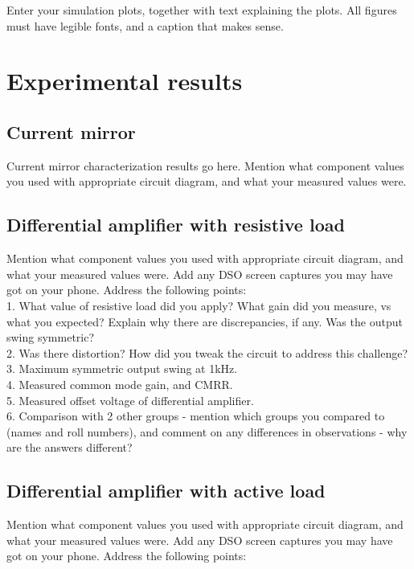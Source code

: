 \documentclass[12pt]{article}
\begin{document}
Enter your simulation plots, together with text explaining the plots. All figures must have legible fonts, and a caption that makes sense.

\section{Experimental results}

\subsection{Current mirror}

Current mirror characterization results go here. Mention what component values you used with appropriate circuit diagram, and what your measured values were.

\subsection{Differential amplifier with resistive load}

Mention what component values you used with appropriate circuit diagram, and what your measured values were. Add any DSO screen captures you may have got on your phone. Address the following points:\\

1. What value of resistive load did you apply? What gain did you measure, vs what you expected? Explain why there are discrepancies, if any. Was the output swing symmetric?\\
2. Was there distortion? How did you tweak the circuit to address this challenge?\\
3. Maximum symmetric output swing at 1kHz.\\
4. Measured common mode gain, and CMRR.\\
5. Measured offset voltage of differential amplifier.\\
6. Comparison with 2 other groups - mention which groups you compared to (names and roll numbers), and comment on any differences in observations - why are the answers different?

\subsection{Differential amplifier with active load}

Mention what component values you used with appropriate circuit diagram, and what your measured values were. Add any DSO screen captures you may have got on your phone. Address the following points:\\
\end{document}
